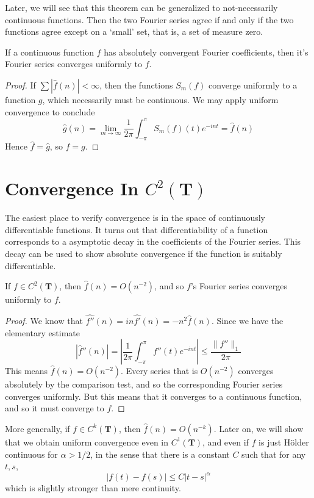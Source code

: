 Later, we will see that this theorem can be generalized to not-necessarily continuous functions. Then the two Fourier series agree if and only if the two functions agree except on a `small' set, that is, a set of measure zero.

\begin{corollary}
    If a continuous function $f$ has absolutely convergent Fourier coefficients, then it's Fourier series converges uniformly to $f$.
\end{corollary}
\begin{proof}
    If $\sum |\widehat{f}(n)| < \infty$, then the functions $S_m(f)$ converge uniformly to a function $g$, which necessarily must be continuous. We may apply uniform convergence to conclude
    \[ \widehat{g}(n) = \lim_{m \to \infty} \frac{1}{2\pi} \int_{-\pi}^\pi S_m(f)(t) e^{-int} = \widehat{f}(n) \]
    Hence $\widehat{f} = \widehat{g}$, so $f = g$.
\end{proof}

\section{Convergence In $C^2(\mathbf{T})$}

The easiest place to verify convergence is in the space of continuously differentiable functions. It turns out that differentiability of a function corresponds to a asymptotic decay in the coefficients of the Fourier series. This decay can be used to show absolute convergence if the function is suitably differentiable.

\begin{theorem}
    If $f \in C^2(\mathbf{T})$, then $\widehat{f}(n) = O(n^{-2})$, and so $f$'s Fourier series converges uniformly to $f$.
\end{theorem}
\begin{proof}
    We know that $\widehat{f''}(n) = in \widehat{f'}(n) = -n^2 \widehat{f}(n)$. Since we have the elementary estimate
    \[ |\widehat{f}''(n)| = \left| \frac{1}{2\pi} \int_{-\pi}^\pi f''(t) e^{-int} \right| \leq \frac{\| f'' \|_1}{2\pi} \]
    This means $\widehat{f}(n) = O(n^{-2})$. Every series that is $O(n^{-2})$ converges absolutely by the comparison test, and so the corresponding Fourier series converges uniformly. But this means that it converges to a continuous function, and so it must converge to $f$.
\end{proof}

More generally, if $f \in C^k(\mathbf{T})$, then $\widehat{f}(n) = O(n^{-k})$. Later on, we will show that we obtain uniform convergence even in $C^1(\mathbf{T})$, and even if $f$ is just H\"{o}lder continuous for $\alpha > 1/2$, in the sense that there is a constant $C$ such that for any $t,s$,
%
\[ |f(t) - f(s)| \leq C|t - s|^\alpha \]
%
which is slightly stronger than mere continuity.


